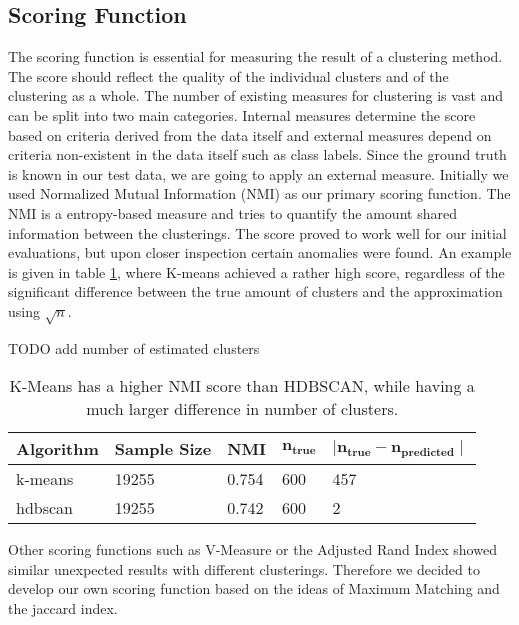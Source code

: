 \subsection{Scoring Function}

The scoring function is essential for measuring the result of a clustering method. The score should reflect the quality of the individual clusters and of the clustering as a whole. The number of existing measures for clustering is vast and can be split into two main categories. Internal measures determine the score based on criteria derived from the data itself and external measures depend on criteria non-existent in the data itself such as class labels. Since the ground truth is known in our test data, we are going to apply an external measure.
Initially we used Normalized Mutual Information (NMI) as our primary scoring function. The NMI is a entropy-based measure and tries to quantify the amount shared information between the clusterings. The score proved to work well for our initial evaluations, but upon closer inspection certain anomalies were found. An example is given in table \ref{tab:nmi_kmeans_example}, where K-means achieved a rather high score, regardless of the significant difference between the true amount of clusters and the approximation using $\sqrt{n}$.


TODO add number of estimated clusters
\begin{table}[h]
    \centering
    \begin{tabular}{|l|l|l|l|l|}
    \hline
    \textbf{Algorithm} & \textbf{Sample Size} & \textbf{NMI}  & $\mathbf{n_{true}}$ & $\mathbf{ \mid n_{true} - n_{predicted} \mid }$ \\ \hline
    k-means & 19255 & 0.754 & 600 & 457 \\ \hline
    hdbscan & 19255 & 0.742 & 600 & 2 \\ \hline
    \end{tabular}
    \caption{K-Means has a higher NMI score than HDBSCAN, while having a much larger difference in number of clusters.}
    \label{tab:nmi_kmeans_example}
\end{table}

Other scoring functions such as V-Measure or the Adjusted Rand Index showed similar unexpected results with different clusterings. Therefore we decided to develop our own scoring function based on the ideas of Maximum Matching and the jaccard index.

